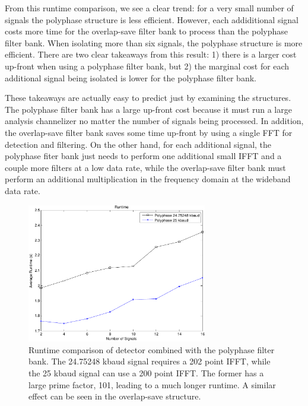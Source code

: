 \documentclass[12pt]{article}
\begin{document}
From this runtime comparison, we see a clear trend: for a very small number of
signals the polyphase structure is less efficient.  However, each addiditional
signal costs more time for the overlap-save filter bank to process than the
polyphase filter bank. When isolating more than six signals, the polyphase
structure is more efficient. There are two clear takeaways from this result: 1)
there is a larger cost up-front when using a polyphase filter bank, but 2) the
marginal cost for each additional signal being isolated is lower for the
polyphase filter bank. 

These takeaways are actually easy to predict just by examining the structures.
The polyphase filter bank has a large up-front cost because it must run a large
analysis channelizer no matter the number of signals being processed. In
addition, the overlap-save filter bank saves some time up-front by using
a single FFT for detection and filtering. On the other hand, for each
additional signal, the polyphase fiter bank just needs to perform one
additional small IFFT and a couple more filters at a low data rate, while the
overlap-save filter bank must perform an additional multiplication in the
frequency domain at the wideband data rate.

\begin{figure}[h!]
    \begin{center}
    \includegraphics[width=0.7\textwidth]{fft_runtime_comparison}%
    \end{center}
    \caption{Runtime comparison of detector combined with the polyphase filter
             bank. The 24.75248 kbaud signal requires a 202 point IFFT, while the 25
             kbaud signal can use a 200 point IFFT. The former has a large prime factor,
             101, leading to a much longer runtime. A similar effect can be seen in the
             overlap-save structure.}
    \label{fig:block_diagram}
\end{figure}
\end{document}

